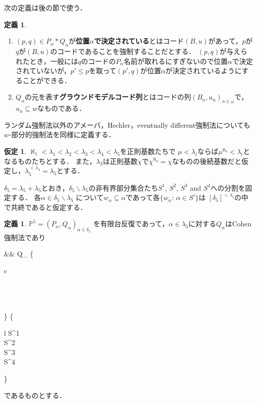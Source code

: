 \documentclass[uplatex,dvipdfmx]{jsarticle}
\newcommand{\Pa}{\mathbb{P}^5}
\renewcommand\subset{\subseteq}
\renewcommand{\setminus}{\smallsetminus}
\theoremstyle{definition}
\newtheorem{defi}[thm]{定義}
\newtheorem{assumption}[thm]{仮定}
\begin{document}
	次の定義は後の節で使う．

	\begin{defi}\label{def:groundmodelsequence}
		\begin{enumerate}
			\item $(p, q) \in P_\alpha \ast Q_\alpha$が\textbf{位置$\alpha$で決定されている}とはコード$(B, u)$があって，$p$が$q$が$(B,u)$のコードであることを強制することだとする．
			$(p, q)$が与えられたとき，一般には$q$のコードの$P_\alpha$名前が取れるにすぎないので位置$\alpha$で決定されていないが，$p' \le p$を取って$(p', q)$が位置$\alpha$が決定されているようにすることができる．
			
			\item \label{item:gms} $Q_\alpha$の元を表す\textbf{グラウンドモデルコード列}とはコードの列$(B_n, u_n)_{n \in \omega}$で，$u_n \subset w$なものである．
		\end{enumerate}
	\end{defi}

	ランダム強制法以外のアメーバ，Hechler，eventually different強制法についても$w$-部分的強制法を同様に定義する．
	
	\begin{assumption}\label{asm:P}
		$\aleph_1<\lambda_1<\lambda_2<\lambda_3<\lambda_4<\lambda_5$を正則基数たちで
		$\mu<\lambda_i$ならば$\mu^{\aleph_0}<\lambda_i$となるものたちとする．
		また，$\lambda_3$は正則基数$\chi$で$\chi^{\aleph_0}=\chi$なものの後続基数だと仮定し，$\lambda_5^{<\lambda_4}=\lambda_5$とする．
		
		$\delta_5=\lambda_5+\lambda_5$とおき，$\delta_5\setminus\lambda_5$の非有界部分集合たち$S^1$, $S^2$, $S^3$ and $S^4$への分割を固定する．
		各$\alpha\in \delta_5\setminus\lambda_5$ について$w_\alpha\subseteq \alpha$であって各$\{w_\alpha:\, \alpha\in S^i\}$は $[\delta_5]^{{<}\lambda_i}$の中で共終であると仮定する．
	\end{assumption}
	
	\begin{defi}\label{def:Pa}
		$\Pa=(P_\alpha,Q_\alpha)_{\alpha\in\delta_5}$ 
		を有限台反復であって，$\alpha\in \lambda_5$に対する$Q_\alpha$はCohen強制法であり
		\begin{flalign*}
			&&
			Q_\alpha\text{ は$w_\alpha$-部分的 }
			\left\{
			\begin{array}{c}
				\\
				\\
				\\
				\\
			\end{array}\right\}
			 \hspace{0.5cm} \text{($\alpha$が}
			\left\{
			\begin{array}{l}
				S^1\\
				S^2\\
				S^3\\
				S^4\\
			\end{array}
			\right\} 
			\\
		\end{flalign*}
		であるものとする．
	\end{defi}
\end{document}
